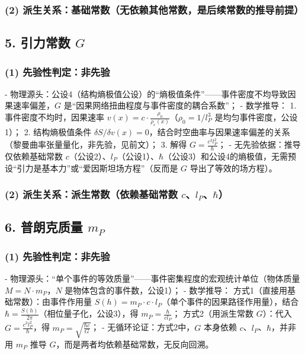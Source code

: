 \documentclass{article}
\begin{document}
\subsubsection*{(2) 派生关系：基础常数（无依赖其他常数，是后续常数的推导前提）}

\subsection*{5. 引力常数 \( G \)}

\subsubsection*{(1) 先验性判定：非先验}

- 物理源头：公设4（结构熵极值公设）的“熵极值条件”——事件密度不均导致因果速率偏差，\( G \) 是“因果网络扭曲程度与事件密度的耦合系数”；
- 数学推导：
  1. 事件密度不均时，因果速率 \( v(x) = c \cdot \frac{\rho_0}{\rho_e(x)} \)（\( \rho_0=1/l_P^3 \) 是均匀事件密度，公设1）；
  2. 结构熵极值条件 \( \delta S/\delta v(x) = 0 \)，结合时空曲率与因果速率偏差的关系（黎曼曲率张量量化，非先验，见前文）；
  3. 解得 \( G = \frac{c^3 l_P^2}{\hbar} \)；
- 无先验依据：推导仅依赖基础常数 \( c \)（公设2）、\( l_P \)（公设1）、\( \hbar \)（公设3）和公设4的熵极值，无需预设“引力是基本力”或“爱因斯坦场方程”（反而是 \( G \) 导出了等效的场方程）。

\subsubsection*{(2) 派生关系：派生常数（依赖基础常数 \( c \)、\( l_P \)、\( \hbar \)）}

\subsection*{6. 普朗克质量 \( m_P \)}

\subsubsection*{(1) 先验性判定：非先验}

- 物理源头：“单个事件的等效质量”——事件密集程度的宏观统计单位（物体质量 \( M = N \cdot m_P \)，\( N \) 是物体包含的事件数，公设1）；
- 数学推导：
  方式1（直接用基础常数）：由事件作用量 \( S(h) = m_P \cdot c \cdot l_P \)（单个事件的因果路径作用量），结合 \( \hbar = \frac{S(h)}{2\pi} \)（相位量子化，公设3），得 \( m_P = \frac{\hbar}{c l_P} \)；
  方式2（用派生常数 \( G \)）：代入 \( G = \frac{c^3 l_P^2}{\hbar} \)，得 \( m_P = \sqrt{\frac{\hbar c}{G}} \)；
- 无循环论证：方式2中，\( G \) 本身依赖 \( c \)、\( l_P \)、\( \hbar \)，并非用 \( m_P \) 推导 \( G \)，而是两者均依赖基础常数，无反向回溯。
\end{document}
